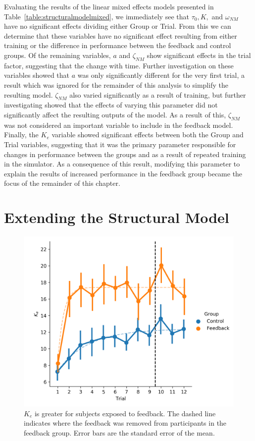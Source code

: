 Evaluating the results of the linear mixed effects models presented in Table~\ref{table:structuralmodelmixed}, we immediately see that $\tau_0, K,$ and $\omega_{NM}$ have no significant effects dividing either Group or Trial.
From this we can determine that these variables have no significant effect resulting from either training or the difference in performance between the feedback and control groups.
Of the remaining variables, $a$ and $\zeta_{NM}$ show significant effects in the trial factor, suggesting that the change with time.
Further investigation on these variables showed that $a$ was only significantly different for the very first trial, a result which was ignored for the remainder of this analysis to simplify the resulting model.
$\zeta_{NM}$ also varied significantly as a result of training, but further investigating showed that the effects of varying this parameter did not significantly affect the resulting outputs of the model.
As a result of this, $\zeta_{NM}$ was not considered an important variable to include in the feedback model.
Finally, the $K_e$ variable showed significant effects between both the Group and Trial variables, suggesting that it was the primary parameter responsible for changes in performance between the groups and as a result of repeated training in the simulator.
As a consequence of this result, modifying this parameter to explain the results of increased performance in the feedback group became the focus of the remainder of this chapter.

\section{Extending the Structural Model}
\begin{figure}[tb]
    \centering
    \includegraphics[width=0.8\linewidth]{figures/Modeling/ke_group.png}
    \caption[$K_e$ is greater for subjects exposed to feedback]{$K_e$ is greater for subjects exposed to feedback.
    The dashed line indicates where the feedback was removed from participants in the feedback group.
    Error bars are the standard error of the mean.}
    \label{fig:ke_group}
\end{figure}

